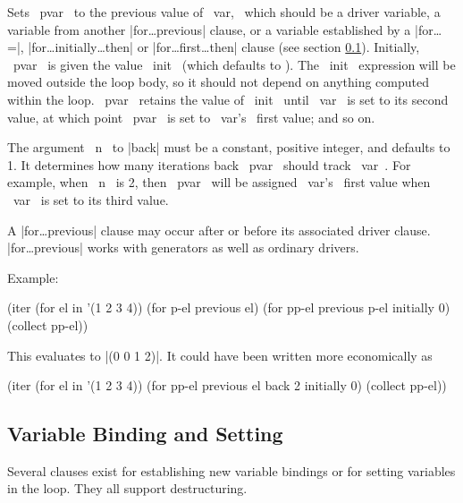 \begin{clauses}

Sets ~pvar~ to the previous value of ~var,~ which should be a driver
variable, a variable from another |for\dots previous| clause, or a
variable established by a |for\dots =|, 
|for\dots initially\dots then| or |for\dots first\dots then| clause
(see section \ref{setting}).
Initially, ~pvar~ is given the value ~init~ (which defaults to \nil).  
The ~init~ expression will be moved outside the loop body, so it
should not depend on anything computed within the loop.
~pvar~ retains the value of ~init~ until ~var~ is set to its second
value, at which point ~pvar~ is set to ~var's~ first value; and so on.  

\cpar The
argument ~n~ to |back| must be a constant, positive integer, and
defaults to 1.  It determines how many iterations back ~pvar~ should
track ~var~.  For example, when ~n~ is 2, then ~pvar~ will be assigned
~var's~ first value when ~var~ is set to its third value.

\cpar A |for\dots previous| clause may occur after or before its
associated driver clause. |for\dots previous| works with generators as
well as ordinary drivers.

\pagebreak[3]

\cpar Example:
\begin{program}
(iter (for el in '(1 2 3 4))
      (for p-el previous el)
      (for pp-el previous p-el initially 0)
      (collect pp-el))
\end{program}
This evaluates to |(0 0 1 2)|.  It could have been written more
economically as 
\begin{program}
(iter (for el in '(1 2 3 4))
      (for pp-el previous el back 2 initially 0)
      (collect pp-el))
\end{program}


\end{clauses}

\subsection{Variable Binding and Setting}
\label{setting}

Several clauses exist for establishing new variable bindings or for
setting variables in the loop.  They all support destructuring.

